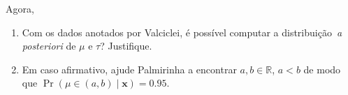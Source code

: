 \documentclass[a4paper,10pt, notitlepage]{report}
\begin{document}
\begin{enumerate}
Agora, 
\begin{enumerate}
 \item Com os dados anotados por Valciclei, é possível computar a distribuição~\textit{a posteriori} de $\mu$ e $\tau$? Justifique.
 \item Em caso afirmativo, ajude Palmirinha a encontrar $a, b \in \mathbb{R}$, $a < b$ de modo que $\operatorname{Pr}(\mu \in (a, b) \mid \boldsymbol{x}) = 0.95$.
\end{enumerate}


\end{enumerate}





\end{document}
